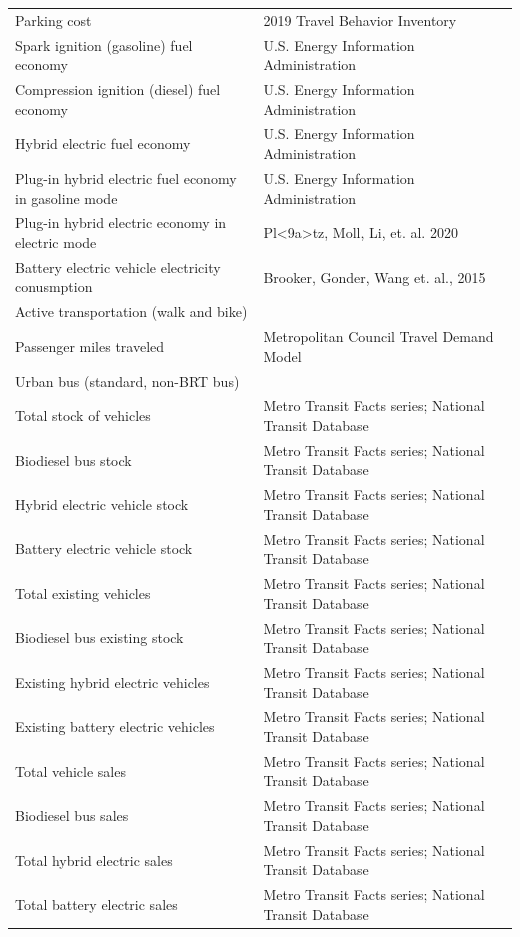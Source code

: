 \documentclass[
]{book}
\begin{document}
\begin{longtable}{ll}
Parking cost & 2019 Travel Behavior Inventory \\ 
Spark ignition (gasoline) fuel economy & U.S. Energy Information Administration \\ 
Compression ignition (diesel) fuel economy & U.S. Energy Information Administration \\ 
Hybrid electric fuel economy & U.S. Energy Information Administration \\ 
Plug-in hybrid electric fuel economy in gasoline mode & U.S. Energy Information Administration \\ 
Plug-in hybrid electric economy in electric mode & Pl<9a>tz, Moll, Li, et. al. 2020 \\ 
Battery electric vehicle electricity conusmption & Brooker, Gonder, Wang et. al., 2015 \\ 
\midrule
\multicolumn{2}{l}{Active transportation (walk and bike)} \\ 
\midrule
Passenger miles traveled & Metropolitan Council Travel Demand Model \\ 
\midrule
\multicolumn{2}{l}{Urban bus (standard, non-BRT bus)} \\ 
\midrule
Total stock of vehicles & Metro Transit Facts series; National Transit Database \\ 
Biodiesel bus stock & Metro Transit Facts series; National Transit Database \\ 
Hybrid electric vehicle stock & Metro Transit Facts series; National Transit Database \\ 
Battery electric vehicle stock & Metro Transit Facts series; National Transit Database \\ 
Total existing vehicles & Metro Transit Facts series; National Transit Database \\ 
Biodiesel bus existing stock & Metro Transit Facts series; National Transit Database \\ 
Existing hybrid electric vehicles & Metro Transit Facts series; National Transit Database \\ 
Existing battery electric vehicles & Metro Transit Facts series; National Transit Database \\ 
Total vehicle sales & Metro Transit Facts series; National Transit Database \\ 
Biodiesel bus sales & Metro Transit Facts series; National Transit Database \\ 
Total hybrid electric sales & Metro Transit Facts series; National Transit Database \\ 
Total battery electric sales & Metro Transit Facts series; National Transit Database \\ 

\end{longtable}
\end{document}
